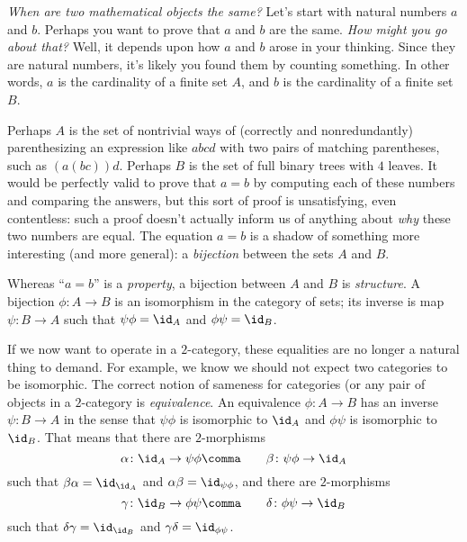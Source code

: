 

\minidiv

\noindent \emph{When are two mathematical objects the same?}
Let's start with natural numbers $a$ and $b$.
Perhaps you want to prove that $a$ and $b$ are the same.
\emph{How might you go about that?}
Well, it depends upon how $a$ and $b$ arose in your thinking.
Since they are natural numbers, it's likely you found them by counting something.
In other words, $a$ is the cardinality of a finite set $A$, and
$b$ is the cardinality of a finite set $B$.

Perhaps $A$ is the set of nontrivial ways of (correctly and nonredundantly) parenthesizing an expression like $abcd$ with two pairs of matching parentheses,
such as $(a(bc))d$.
Perhaps $B$ is the set of full binary trees with $4$ leaves.
It would be perfectly valid to prove that $a=b$ by computing each of these numbers and comparing the answers, but
this sort of proof is unsatisfying, even contentless:
such a proof doesn't actually inform us of anything about \emph{why} these two numbers are equal.
The equation $a=b$ is a shadow of something more interesting (and more general):
a \emph{bijection} between the sets $A$ and $B$.

Whereas \enquote{$a=b$} is a \emph{property}, a bijection between $A$ and $B$ is \emph{structure}.
A bijection $\phi \colon A \to B$ is an isomorphism in the category of sets;
its inverse is map $\psi \colon B \to A$ such that $\psi\phi = \id_A$ and $\phi\psi = \id_B$.

If we now want to operate in a $2$-category, these equalities are no longer a natural thing to demand.
For example, we know we should not expect two categories to be isomorphic.
The correct notion of sameness for categories (or any pair of objects in a $2$-category is \emph{equivalence}.
An equivalence $\phi \colon A \to B$ has an inverse $\psi \colon B \to A$ in the sense that $\psi\phi$ is isomorphic to $\id_A$ and $\phi\psi$ is isomorphic to $\id_B$.
That means that there are $2$-morphisms
\[
  \alpha \colon \id_A \to \psi\phi \comma \qquad \beta \colon \psi\phi \to \id_A 
\]
such that $\beta\alpha = \id_{\id_A}$ and $\alpha\beta = \id_{\psi\phi}$,
and there are $2$-morphisms
\[
  \gamma \colon \id_B \to \phi\psi \comma \qquad \delta \colon \phi\psi \to \id_B 
\]
such that $\delta\gamma = \id_{\id_B}$ and $\gamma\delta = \id_{\phi\psi}$.




